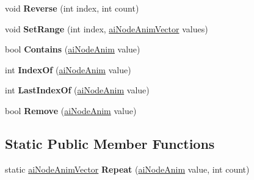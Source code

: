 \begin{DoxyCompactItemize}
\item 
\hypertarget{classai_node_anim_vector_a3685cd8127889244c1a4a0624ddd0d87}{void {\bfseries Reverse} (int index, int count)}\label{classai_node_anim_vector_a3685cd8127889244c1a4a0624ddd0d87}

\item 
\hypertarget{classai_node_anim_vector_a4d5005181b0985cc49b22589e57e673e}{void {\bfseries Set\+Range} (int index, \hyperlink{classai_node_anim_vector}{ai\+Node\+Anim\+Vector} values)}\label{classai_node_anim_vector_a4d5005181b0985cc49b22589e57e673e}

\item 
\hypertarget{classai_node_anim_vector_a9ae4ff7f88660d4f7cf86b2df85f8964}{bool {\bfseries Contains} (\hyperlink{structai_node_anim}{ai\+Node\+Anim} value)}\label{classai_node_anim_vector_a9ae4ff7f88660d4f7cf86b2df85f8964}

\item 
\hypertarget{classai_node_anim_vector_a5babeda12f2934db45bad966be324172}{int {\bfseries Index\+Of} (\hyperlink{structai_node_anim}{ai\+Node\+Anim} value)}\label{classai_node_anim_vector_a5babeda12f2934db45bad966be324172}

\item 
\hypertarget{classai_node_anim_vector_a938fffeb29695c69dab42d0d6fae2ad5}{int {\bfseries Last\+Index\+Of} (\hyperlink{structai_node_anim}{ai\+Node\+Anim} value)}\label{classai_node_anim_vector_a938fffeb29695c69dab42d0d6fae2ad5}

\item 
\hypertarget{classai_node_anim_vector_a83aac2c6c721d175563a852c57275290}{bool {\bfseries Remove} (\hyperlink{structai_node_anim}{ai\+Node\+Anim} value)}\label{classai_node_anim_vector_a83aac2c6c721d175563a852c57275290}

\end{DoxyCompactItemize}
\subsection*{Static Public Member Functions}
\begin{DoxyCompactItemize}
\item 
\hypertarget{classai_node_anim_vector_a87be00e8e08c972bf88e96afc66b5a6e}{static \hyperlink{classai_node_anim_vector}{ai\+Node\+Anim\+Vector} {\bfseries Repeat} (\hyperlink{structai_node_anim}{ai\+Node\+Anim} value, int count)}\label{classai_node_anim_vector_a87be00e8e08c972bf88e96afc66b5a6e}

\end{DoxyCompactItemize}
